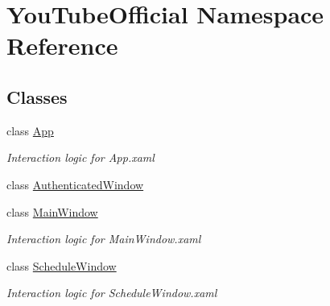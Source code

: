 \hypertarget{namespace_you_tube_official}{}\section{You\+Tube\+Official Namespace Reference}
\label{namespace_you_tube_official}
\subsection*{Classes}
\begin{DoxyCompactItemize}
\item 
class \mbox{\hyperlink{class_you_tube_official_1_1_app}{App}}
\begin{DoxyCompactList}\small\item\em Interaction logic for App.\+xaml \end{DoxyCompactList}\item 
class \mbox{\hyperlink{class_you_tube_official_1_1_authenticated_window}{Authenticated\+Window}}
\item 
class \mbox{\hyperlink{class_you_tube_official_1_1_main_window}{Main\+Window}}
\begin{DoxyCompactList}\small\item\em Interaction logic for Main\+Window.\+xaml \end{DoxyCompactList}\item 
class \mbox{\hyperlink{class_you_tube_official_1_1_schedule_window}{Schedule\+Window}}
\begin{DoxyCompactList}\small\item\em Interaction logic for Schedule\+Window.\+xaml \end{DoxyCompactList}\end{DoxyCompactItemize}
